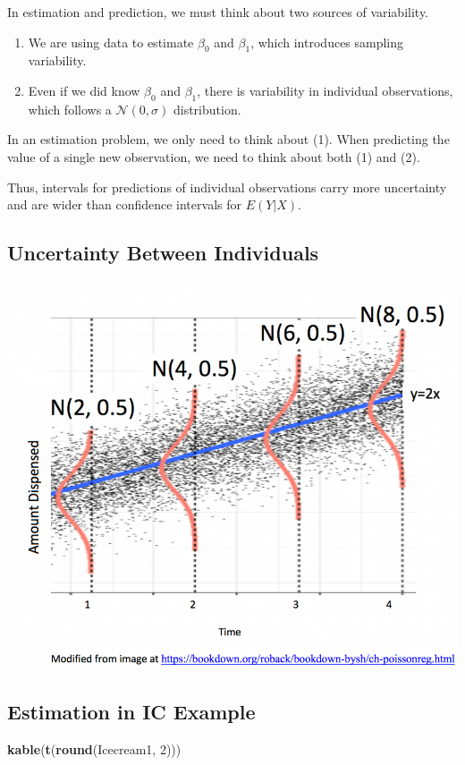 \documentclass[]{book}
\newenvironment{Shaded}{\begin{snugshade}}{\end{snugshade}}
\newcommand{\KeywordTok}[1]{\textcolor[rgb]{0.13,0.29,0.53}{\textbf{#1}}}
\newcommand{\DecValTok}[1]{\textcolor[rgb]{0.00,0.00,0.81}{#1}}
\newcommand{\NormalTok}[1]{#1}
\providecommand{\tightlist}{%
  \setlength{\itemsep}{0pt}\setlength{\parskip}{0pt}}
\begin{document}
In estimation and prediction, we must think about two sources of
variability.

\begin{enumerate}
\def\labelenumi{\arabic{enumi}.}
\tightlist
\item
  We are using data to estimate \(\beta_0\) and \(\beta_1\), which
  introduces sampling variability.\\
\item
  Even if we did know \(\beta_0\) and \(\beta_1\), there is variability
  in individual observations, which follows a \(\mathcal{N}(0, \sigma)\)
  distribution.
\end{enumerate}

In an estimation problem, we only need to think about (1). When
predicting the value of a single new observation, we need to think about
both (1) and (2).

Thus, intervals for predictions of individual observations carry more
uncertainty and are wider than confidence intervals for \(E(Y|X)\).

\subsection{Uncertainty Between
Individuals}\label{uncertainty-between-individuals}

\includegraphics[width=0.5\linewidth]{SLR_Model_Assumptions}

\subsection{Estimation in IC Example}\label{estimation-in-ic-example}

\begin{Shaded}
\begin{Highlighting}[]
\KeywordTok{kable}\NormalTok{(}\KeywordTok{t}\NormalTok{(}\KeywordTok{round}\NormalTok{(Icecream1, }\DecValTok{2}\NormalTok{)))}
\end{Highlighting}
\end{Shaded}
\end{document}
